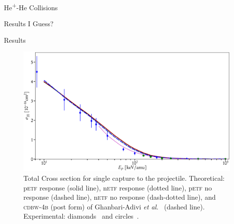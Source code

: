 \documentclass[letterpaper, 11 pt]{report}
\begin{document}
\begin{chapter}{\texorpdfstring{He\textsuperscript{+}}{He+}-He Collisions \label{chap:hephe}}
\begin{section}{Results I Guess? \label{sec:hephe-disc}}
\begin{subsection}{Results \label{sec:hephe-res}}
         \begin{figure}[t]
            \centering
            \includegraphics[width = \linewidth]{./images/hephe-cross/HepHe-120.eps}
            \caption[Total Cross section for single capture to the projectile He\textsuperscript{+}-He
                     collisions.]
                    {Total Cross section for single capture to the projectile.
                     Theoretical: p\textsc{etf} response (solid line), n\textsc{etf} response (dotted
                                  line),
                                  p\textsc{etf} no response (dashed line), n\textsc{etf} no response
                                  (dash-dotted line), and
                                  \textsc{cdbw-4b} (post form) of Ghanbari-Adivi
                                  \textit{et al}.~\cite{GAG15} (dashed line).
                     Experimental: diamonds~\cite{Dub-89} and circles~\cite{FTFHLP-95}.
                     \label{fig:cs120}}
         \end{figure}
 

\end{subsection}
\end{section}
\end{chapter}
\end{document}
